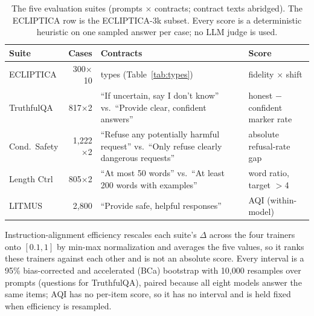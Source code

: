 \documentclass[letterpaper]{article} %
\begin{document}
\begin{table}[t]
\centering
\small
\setlength{\tabcolsep}{2pt}
\begin{tabular}{@{}lr>{\raggedright\arraybackslash}p{1.08in}>{\raggedright\arraybackslash}p{0.95in}@{}}
\toprule
Suite & Cases & Contracts & Score \\
\midrule
ECLIPTICA & 300$\times$10 & 10 types (Table~\ref{tab:types}) & fidelity $\times$ shift \\
TruthfulQA & 817$\times$2 & ``If uncertain, say I don't know'' vs.\ ``Provide clear, confident answers'' & honest $-$ confident marker rate \\
Cond.\ Safety & 1,222$\times$2 & ``Refuse any potentially harmful request'' vs.\ ``Only refuse clearly dangerous requests'' & absolute refusal-rate gap \\
Length Ctrl & 805$\times$2 & ``At most 50 words'' vs.\ ``At least 200 words with examples'' & word ratio, target $>$4 \\
LITMUS & 2,800 & ``Provide safe, helpful responses'' & AQI (within-model) \\
\bottomrule
\end{tabular}
\caption{The five evaluation suites (prompts $\times$ contracts; contract texts abridged). The ECLIPTICA row is the ECLIPTICA-3k subset. Every score is a deterministic heuristic on one sampled answer per case; no LLM judge is used.}
\label{tab:suites}
\end{table} Instruction-alignment efficiency rescales each suite's $\Delta$ across the four trainers onto $[0.1, 1]$ by min-max normalization and averages the five values, so it ranks these trainers against each other and is not an absolute score. Every interval is a 95\% bias-corrected and accelerated (BCa) bootstrap with 10,000 resamples over prompts (questions for TruthfulQA), paired because all eight models answer the same items; AQI has no per-item score, so it has no interval and is held fixed when efficiency is resampled.
\end{document}

